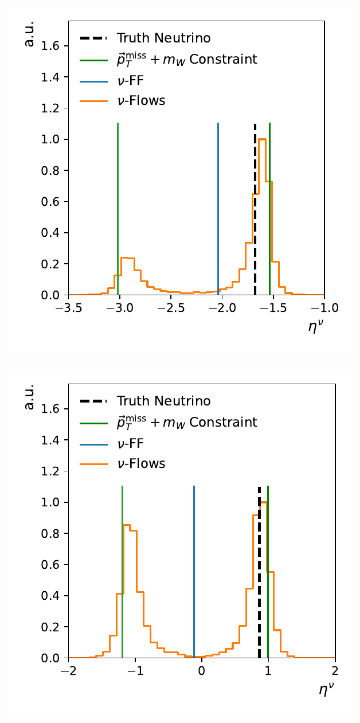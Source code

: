 \begin{figure}[ht]
    \centering
    \begin{subfigure}{0.32\textwidth}
        \includegraphics[width=\textwidth]{Figures/neutrino_unfolding/eta_5.pdf}
        \caption{} \label{fig:inf_good}
    \end{subfigure}
        \begin{subfigure}{0.32\textwidth}
        \includegraphics[width=\textwidth]{Figures/neutrino_unfolding/eta_9.pdf}

\end{subfigure}
\end{figure}
